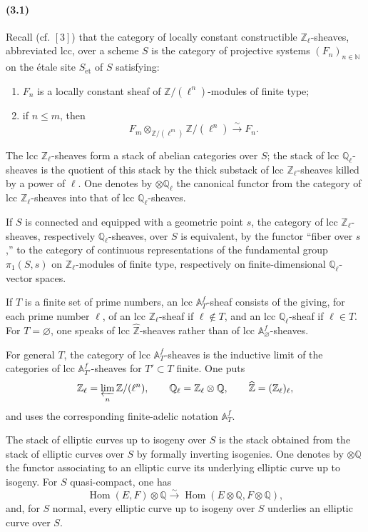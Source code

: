 \documentclass[10pt]{article}
\newcommand{\Q}{\mathbb Q}
\newcommand{\Z}{\mathbb Z}
\newcommand{\bZ}{\widehat{\mathbb Z}}
\newcommand{\Hom}{\operatorname{Hom}}
\newcommand{\et}{\mathrm{\acute et}}
\begin{document}
\paragraph{(3.1)}
Recall (cf. \([3]\)) that the category of locally constant constructible $\Z_\ell$-sheaves,
abbreviated lcc, over a scheme $S$ is the category of projective systems $(F_n)_{n\in\mathbb N}$
on the étale site $S_{\et}$ of $S$ satisfying:
\begin{enumerate}[label=(\roman*)]
\item $F_n$ is a locally constant sheaf of $\Z/(\ell^n)$-modules of finite type;
\item if $n\le m$, then
\[
F_m\otimes_{\Z/(\ell^m)}\Z/(\ell^n)\xrightarrow{\sim}F_n.
\]
\end{enumerate}
The lcc $\Z_\ell$-sheaves form a stack of abelian categories over $S$; the stack of lcc
$\Q_\ell$-sheaves is the quotient of this stack by the thick substack of lcc $\Z_\ell$-sheaves
killed by a power of $\ell$. One denotes by $\otimes\Q_\ell$ the canonical functor from the
category of lcc $\Z_\ell$-sheaves into that of lcc $\Q_\ell$-sheaves.

If $S$ is connected and equipped with a geometric point $s$, the category of lcc
$\Z_\ell$-sheaves, respectively $\Q_\ell$-sheaves, over $S$ is equivalent, by the functor
``fiber over $s$,'' to the category of continuous representations of the fundamental group
$\pi_1(S,s)$ on $\Z_\ell$-modules of finite type, respectively on finite-dimensional
$\Q_\ell$-vector spaces.

If $T$ is a finite set of prime numbers, an lcc $\mathbb A_T^f$-sheaf consists of the giving, for
each prime number $\ell$, of an lcc $\Z_\ell$-sheaf if $\ell\notin T$, and an lcc
$\Q_\ell$-sheaf if $\ell\in T$. For $T=\varnothing$, one speaks of lcc $\bZ$-sheaves rather
than of lcc $\mathbb A_\varnothing^f$-sheaves.

For general $T$, the category of lcc $\mathbb A_T^f$-sheaves is the inductive limit of the categories
of lcc $\mathbb A_{T'}^f$-sheaves for $T'\subset T$ finite. One puts
\[
\Z_\ell=\varprojlim_n \Z/(\ell^n),\qquad
\Q_\ell=\Z_\ell\otimes\Q,\qquad
\bZ=(\Z_\ell)_\ell,
\]
and uses the corresponding finite-adelic notation $\mathbb A_T^f$.

The stack of elliptic curves up to isogeny over $S$ is the stack obtained from the stack
of elliptic curves over $S$ by formally inverting isogenies. One denotes by $\otimes\Q$ the
functor associating to an elliptic curve its underlying elliptic curve up to isogeny. For $S$
quasi-compact, one has
\[
\Hom(E,F)\otimes\Q\xrightarrow{\sim}\Hom(E\otimes\Q,F\otimes\Q),
\]
and, for $S$ normal, every elliptic curve up to isogeny over $S$ underlies an elliptic curve
over $S$.
\end{document}
